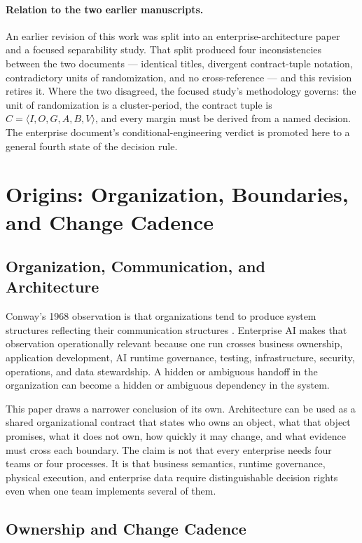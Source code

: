 \documentclass[11pt]{article}
\begin{document}
\paragraph{Relation to the two earlier manuscripts.}
An earlier revision of this work was split into an enterprise-architecture paper and a focused separability study. That split produced four inconsistencies between the two documents --- identical titles, divergent contract-tuple notation, contradictory units of randomization, and no cross-reference --- and this revision retires it. Where the two disagreed, the focused study's methodology governs: the unit of randomization is a cluster-period, the contract tuple is $C=\langle I,O,G,A,B,V\rangle$, and every margin must be derived from a named decision. The enterprise document's conditional-engineering verdict is promoted here to a general fourth state of the decision rule.

\section{Origins: Organization, Boundaries, and Change Cadence}
\label{sec:origins}

\subsection{Organization, Communication, and Architecture}

Conway's 1968 observation is that organizations tend to produce system structures reflecting their communication structures \cite{conway1968committees}. Enterprise AI makes that observation operationally relevant because one run crosses business ownership, application development, AI runtime governance, testing, infrastructure, security, operations, and data stewardship. A hidden or ambiguous handoff in the organization can become a hidden or ambiguous dependency in the system.

This paper draws a narrower conclusion of its own. Architecture can be used as a shared organizational contract that states who owns an object, what that object promises, what it does not own, how quickly it may change, and what evidence must cross each boundary. The claim is not that every enterprise needs four teams or four processes. It is that business semantics, runtime governance, physical execution, and enterprise data require distinguishable decision rights even when one team implements several of them.

\subsection{Ownership and Change Cadence}
\end{document}
